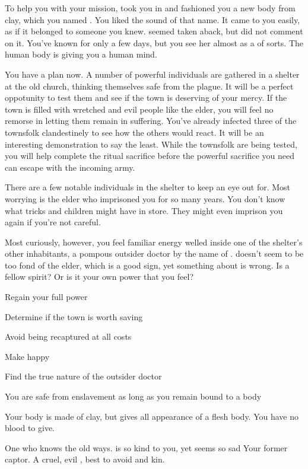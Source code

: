\documentclass[char]{Pestilence}
\begin{document}
To help you with your mission, \cShaman{} took you in and fashioned you a new body from clay, which you named \cPlaguebearer{}. You liked the sound of that name. It came to you easily, as if it belonged to someone you knew.  \cShaman{} seemed taken aback, but \cShaman{\they} did not comment on it. You've known \cShaman{\them} for only a few days, but you see her almost as a \cShaman{\parent} of sorts. The human body is giving you a human mind.

You have a plan now. A number of powerful individuals are gathered in a shelter at the old church, thinking themselves safe from the plague. It will be a perfect oppotunity to test them and see if the town is deserving of your mercy. If the town is filled with wretched and evil people like the elder, you will feel no remorse in letting them remain in suffering. You've already infected three of the townsfolk clandestinely to see how the others would react. It will be an interesting demonstration to say the least. While the townsfolk are being tested, you will help \cShaman{} complete the ritual sacrifice before the powerful sacrifice you need can escape with the incoming army.

There are a few notable individuals in the shelter to keep an eye out for. Most worrying is the elder who imprisoned you for so many years. You don't know what tricks \cElder{\they} and \cElder{\their} children might have in store. They might even imprison you again if you're not careful. 

Most curiously, however, you feel familiar energy welled inside one of the shelter's other inhabitants, a pompous outsider doctor by the name of \cOutsider{}. \cOutsider{\They} doesn't seem to be too fond of the elder, which is a good sign, yet something about \cOutsider{\them} is wrong. Is \cOutsider{\they} a fellow spirit? Or is it your own power that you feel?

\begin{itemz}[Goals]
	\item Regain your full power
	\item Determine if the town is worth saving
	\item Avoid being recaptured at all costs
	\item Make \cShaman{} happy
	\item Find the true nature of the outsider doctor
\end{itemz}

\begin{itemz}[Notes]
	\item You are safe from enslavement as long as you remain bound to a body
	\item Your body is made of clay, but gives all appearance of a flesh body. You have no blood to give.
\end{itemz}

\begin{contacts}
	\contact{\cShaman{}} One who knows the old ways. \cShaman{\They} is so kind to you, yet \cShaman{\they} seems so sad
	\contact{\cElder{}} Your former captor. A cruel, evil \cElder{\human}, best to avoid \cElder{\them} and \cElder{\their} kin.
\end{contacts}
\end{document}
